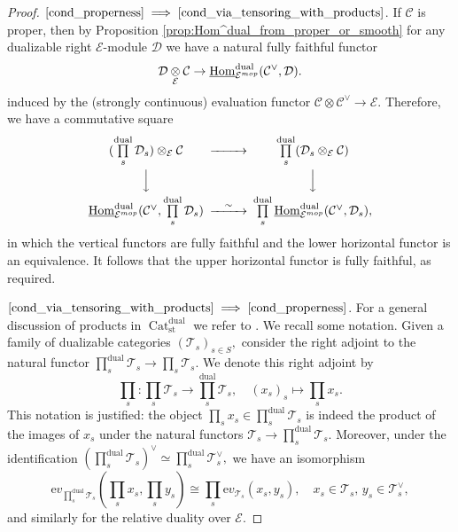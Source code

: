 \documentclass[11pt,leqno]{amsart}
\newcommand{\Implies}[2]{$\text{\ref{#1}}\implies\text{\ref{#2}}$}
\numberwithin{equation}{section}
\def\Hom{\operatorname{Hom}}
\newcommand{\tens}[1]{%
  \mathbin{\mathop{\otimes}\displaylimits_{#1}}%
}
\newcommand{\prodd}[1][]{\mathop{\prod}\limits_{#1}}
\newcommand{\Cat}{\operatorname{Cat}}
\newcommand{\st}{\operatorname{st}}
\newcommand{\dual}{\operatorname{dual}}
\newcommand{\ev}{\mathrm ev}
\newcommand{\cD}{{\mathcal D}}
\newcommand{\cC}{{\mathcal C}}
\newcommand{\cE}{{\mathcal E}}
\newcommand{\cT}{{\mathcal T}}
\newcommand{\un}{\underline}
\begin{document}
\begin{proof}
\Implies{cond_properness}{cond_via_tensoring_with_products}. If $\cC$ is proper, then by Proposition \ref{prop:Hom^dual_from_proper_or_smooth} for any dualizable right $\cE$-module $\cD$ we have a natural fully faithful functor
\begin{equation*}
\cD\tens{\cE}\cC\to \un{\Hom}^{\dual}_{\cE^{mop}}(\cC^{\vee},\cD).
\end{equation*}
induced by the (strongly continuous) evaluation functor $\cC\otimes\cC^{\vee}\to\cE.$ Therefore, we have a commutative square
\begin{equation*}
\begin{CD}
(\prodd[s]^{\dual}\cD_s)\tens{\cE}\cC @>>> \prodd[s]^{\dual}(\cD_s\tens{\cE}\cC)\\
@VVV @VVV\\
 \un{\Hom}^{\dual}_{\cE^{mop}}(\cC^{\vee},\prodd[s]^{\dual}\cD_s) @>{\sim}>> \prodd[s]^{\dual}\un{\Hom}^{\dual}_{\cE^{mop}}(\cC^{\vee},\cD_s), 
\end{CD}
\end{equation*}
in which the vertical functors are fully faithful and the lower horizontal functor is an equivalence. It follows that the upper horizontal functor is fully faithful, as required.

\Implies{cond_via_tensoring_with_products}{cond_properness}. For a general discussion of products in $\Cat_{\st}^{\dual}$ we refer to \cite[Section 1.17]{E24}. We recall some notation. Given a family of dualizable categories $(\cT_s)_{s\in S},$ consider the right adjoint to the natural functor $\prodd[s]^{\dual}\cT_s\to\prodd[s]\cT_s.$ We denote this right adjoint by
\begin{equation*}
\prodd[s]:\prodd[s]\cT_s\to \prodd[s]^{\dual}\cT_s,\quad (x_s)_s\mapsto \prodd[s] x_s. 
\end{equation*}   
This notation is justified: the object $\prodd[s]x_s\in\prodd[s]^{\dual}\cT_s$ is indeed the product of the images of $x_s$ under the natural functors $\cT_s\to\prodd[s]^{\dual}\cT_s.$ Moreover, under the identification $(\prodd[s]^{\dual}\cT_s)^{\vee}\simeq \prodd[s]^{\dual}\cT_s^{\vee},$ we have an isomorphism
\begin{equation*}
\ev_{\prodd[s]^{\dual}\cT_s}(\prodd[s]x_s,\prodd[s]y_s)\cong \prodd[s]\ev_{\cT_s}(x_s,y_s),\quad x_s\in\cT_s,\,y_s\in\cT_s^{\vee},
\end{equation*}
and similarly for the relative duality over $\cE.$


\end{proof}
\end{document}
